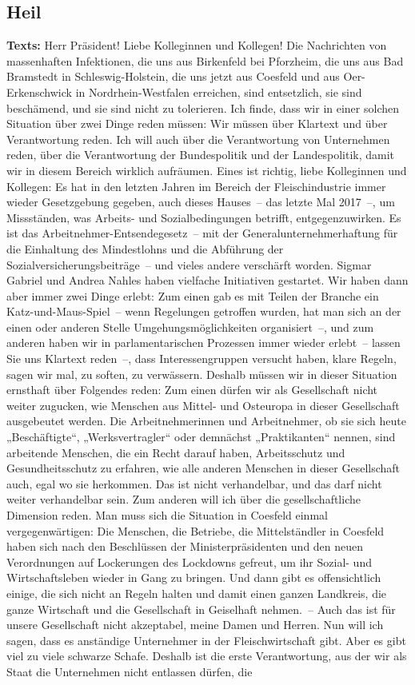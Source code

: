 \documentclass{article}
\begin{document}
\subsection{Heil}
\noindent\textbf{Texts:} Herr Präsident! Liebe Kolleginnen und Kollegen! Die Nachrichten von massenhaften Infektionen, die uns aus Birkenfeld bei Pforzheim, die uns aus Bad Bramstedt in Schleswig-Holstein, die uns jetzt aus Coesfeld und aus Oer-Erkenschwick in Nordrhein-Westfalen erreichen, sind entsetzlich, sie sind beschämend, und sie sind nicht zu tolerieren.  Ich finde, dass wir in einer solchen Situation über zwei Dinge reden müssen: Wir müssen über Klartext und über Verantwortung reden. Ich will auch über die Verantwortung von Unternehmen reden, über die Verantwortung der Bundespolitik und der Landespolitik, damit wir in diesem Bereich wirklich aufräumen. Eines ist richtig, liebe Kolleginnen und Kollegen: Es hat in den letzten Jahren im Bereich der Fleischindustrie immer wieder Gesetzgebung gegeben, auch dieses Hauses – das letzte Mal 2017 –, um Missständen, was Arbeits- und Sozialbedingungen betrifft, entgegenzuwirken. Es ist das Arbeitnehmer-Entsendegesetz – mit der Generalunternehmerhaftung für die Einhaltung des Mindestlohns und die Abführung der Sozialversicherungsbeiträge – und vieles andere verschärft worden. Sigmar Gabriel und Andrea Nahles haben vielfache Initiativen gestartet. Wir haben dann aber immer zwei Dinge erlebt: Zum einen gab es mit Teilen der Branche ein Katz-und-Maus-Spiel – wenn Regelungen getroffen wurden, hat man sich an der einen oder anderen Stelle Umgehungsmöglichkeiten organisiert –, und zum anderen haben wir in parlamentarischen Prozessen immer wieder erlebt – lassen Sie uns Klartext reden –, dass Interessengruppen versucht haben, klare Regeln, sagen wir mal, zu soften, zu verwässern. Deshalb müssen wir in dieser Situation ernsthaft über Folgendes reden: Zum einen dürfen wir als Gesellschaft nicht weiter zugucken, wie Menschen aus Mittel- und Osteuropa in dieser Gesellschaft ausgebeutet werden.  Die Arbeitnehmerinnen und Arbeitnehmer, ob sie sich heute „Beschäftigte“, „Werksvertragler“ oder demnächst „Praktikanten“ nennen, sind arbeitende Menschen, die ein Recht darauf haben, Arbeitsschutz und Gesundheitsschutz zu erfahren, wie alle anderen Menschen in dieser Gesellschaft auch, egal wo sie herkommen. Das ist nicht verhandelbar, und das darf nicht weiter verhandelbar sein. Zum anderen will ich über die gesellschaftliche Dimension reden. Man muss sich die Situation in Coesfeld einmal vergegenwärtigen: Die Menschen, die Betriebe, die Mittelständler in Coesfeld haben sich nach den Beschlüssen der Ministerpräsidenten und den neuen Verordnungen auf Lockerungen des Lockdowns gefreut, um ihr Sozial- und Wirtschaftsleben wieder in Gang zu bringen. Und dann gibt es offensichtlich einige, die sich nicht an Regeln halten und damit einen ganzen Landkreis, die ganze Wirtschaft und die Gesellschaft in Geiselhaft nehmen. – Auch das ist für unsere Gesellschaft nicht akzeptabel, meine Damen und Herren.  Nun will ich sagen, dass es anständige Unternehmer in der Fleischwirtschaft gibt. Aber es gibt viel zu viele schwarze Schafe. Deshalb ist die erste Verantwortung, aus der wir als Staat die Unternehmen nicht entlassen dürfen, die 
\end{document}
